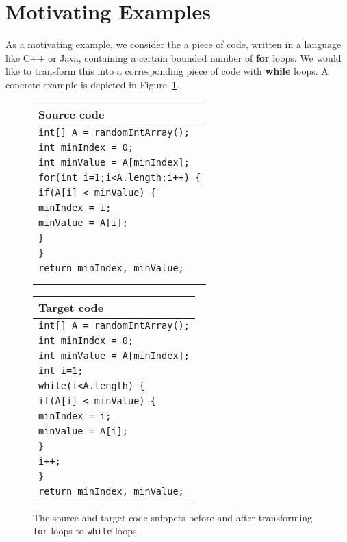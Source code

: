 \section{Motivating Examples}\label{sec:motivatingExamples}

As a motivating example, we consider the a piece of code, written in a language like C++ or Java, containing a certain bounded number of \textbf{for} loops. We would like to transform this into a corresponding piece of code with \textbf{while} loops. A concrete example is depicted in Figure~\ref{fig:code-snippets}.
\begin{figure} {
    \footnotesize
    \begin{tabular}{p{}} 
        Source code \\ \hline
        \texttt{int[] A = randomIntArray();} \\
        \texttt{int minIndex = 0;} \\
        \texttt{int minValue = A[minIndex];} \\
        \texttt{for(int i=1;i<A.length;i++) \{} \\
        \texttt{\quad if(A[i] < minValue) \{} \\
        \texttt{\quad \quad minIndex = i;} \\
        \texttt{\quad \quad	minValue = A[i];} \\
        \texttt{\quad \}} \\
        \texttt{\}} \\
        \texttt{return minIndex, minValue;} \\
        \\
        \\
    \end{tabular}
    \hfil
    \begin{tabular}{p{}} 
        Target code \\ \hline
        \texttt{int[] A = randomIntArray();} \\
        \texttt{int minIndex = 0;} \\
        \texttt{int minValue = A[minIndex];} \\
        \texttt{int i=1;} \\
        \texttt{while(i<A.length) \{} \\
        \texttt{\quad if(A[i] < minValue) \{} \\
        \texttt{\quad \quad minIndex = i;} \\
        \texttt{\quad \quad minValue = A[i];} \\
        \texttt{\quad \}} \\
        \texttt{\quad i++;} \\
        \texttt{\}} \\
        \texttt{return minIndex, minValue;} \\
    \end{tabular}
}
\caption{The source and target code snippets before and after transforming \texttt{for} loops to \texttt{while} loops.}\label{fig:code-snippets}
\end{figure}


